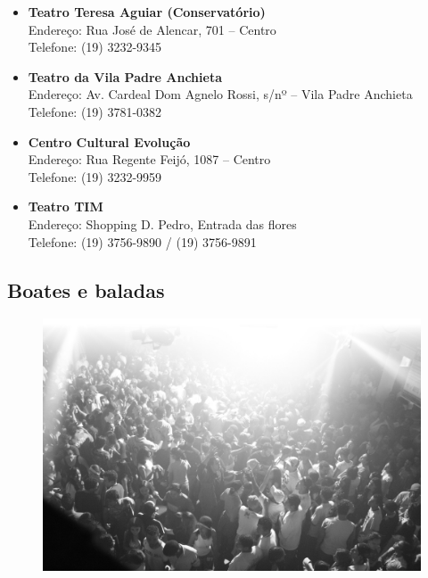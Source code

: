 \begin{itemize}
\item   \textbf{Teatro Teresa Aguiar (Conservatório)}
		\\Endereço: Rua José de Alencar, 701 -- Centro
		\\Telefone: (19) 3232-9345

\item   \textbf{Teatro da Vila Padre Anchieta}
		\\Endereço: Av. Cardeal Dom Agnelo Rossi, s/nº -- Vila Padre Anchieta
		\\Telefone: (19) 3781-0382

\item   \textbf{Centro Cultural Evolução}
		\\Endereço: Rua Regente Feijó, 1087 -- Centro
		\\Telefone: (19) 3232-9959

\item   \textbf{Teatro TIM}
		\\Endereço: Shopping D. Pedro, Entrada das flores
		\\Telefone: (19) 3756-9890 / (19) 3756-9891

\end{itemize}

\subsection{Boates e baladas}

\begin{figure}[hb!]
    \centering
    \includegraphics[scale=0.15,keepaspectratio=true]{img/imgs/7-diversao/-053.jpg}
\end{figure}

